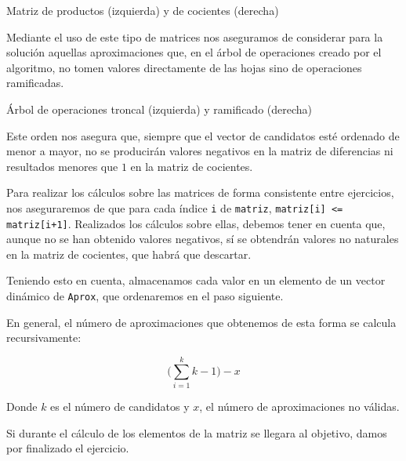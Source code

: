 \begin{center}
Matriz de productos (izquierda) y de cocientes (derecha)
\end{center}

Mediante el uso de este tipo de matrices nos aseguramos de considerar para la solución aquellas aproximaciones que, en el árbol de operaciones creado por el algoritmo, no tomen valores directamente de las hojas sino de operaciones ramificadas.

\begin{center}

Árbol de operaciones troncal (izquierda) y ramificado (derecha)
\end{center}

Este orden nos asegura que, siempre que el vector de candidatos esté ordenado de menor a mayor, no se producirán valores negativos en la matriz de diferencias ni resultados menores que $1$ en la matriz de cocientes.

Para realizar los cálculos sobre las matrices de forma consistente entre ejercicios, nos aseguraremos de que para cada índice \texttt{i} de \texttt{matriz}, \texttt{matriz[i] <= matriz[i+1]}.
Realizados los cálculos sobre ellas, debemos tener en cuenta que, aunque no se han obtenido valores negativos, sí se obtendrán valores no naturales en la matriz de cocientes, que habrá que descartar.

Teniendo esto en cuenta, almacenamos cada valor en un elemento de un vector dinámico de \texttt{Aprox}, que ordenaremos en el paso siguiente.

En general, el número de aproximaciones que obtenemos de esta forma se calcula recursivamente:

\begin{center}
\[\Bigg(\sum_{i=1}^{k}k-1\Bigg)-x\]

Donde $k$ es el número de candidatos y $x$, el número de aproximaciones no válidas.
\end{center}

Si durante el cálculo de los elementos de la matriz se llegara al objetivo, damos por finalizado el ejercicio.

